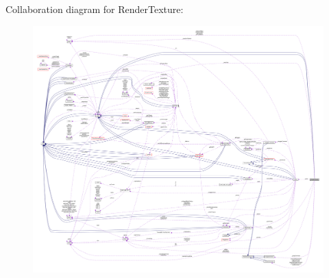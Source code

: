 Collaboration diagram for Render\+Texture\+:
\nopagebreak
\begin{figure}[H]
\begin{center}
\leavevmode
\includegraphics[width=350pt]{classRenderTexture__coll__graph}
\end{center}
\end{figure}
